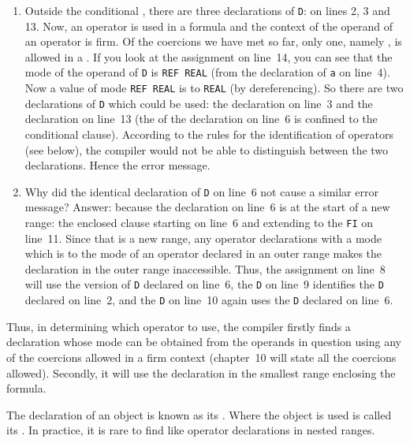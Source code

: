 \begin{enumerate}
\item Outside the conditional ,
there are three declarations of \verb|D|: on lines 2, 3 and 13. Now,
an operator is used in a formula and the context of the operand of an
operator is firm. Of the coercions we have met so far, only one,
namely , is allowed in
a .  If you look at the assignment
on line~14, you can see that the mode of the operand of \verb|D| is
\verb|REF REAL| (from the declaration of \verb|a| on line~4).  Now a
value of mode \verb|REF REAL| is  to \verb|REAL|
(by dereferencing).  So there are two declarations of \verb|D| which
could be used: the declaration on line~3 and the declaration on
line~13 (the  of the declaration on line~6 is confined to
the conditional clause).  According to the rules for the
identification of operators (see below), the compiler would not be
able to distinguish between the two declarations.  Hence the error
message.
\item Why did the identical declaration of \verb|D| on line~6 not
cause a similar error message? Answer: because the declaration on
line~6 is at the start of a new range: the enclosed clause starting
on line~6 and extending to the \verb|FI| on line~11.  Since that is a
new range, any operator declarations with a mode which is
 to the mode of an operator declared in an outer
range makes the declaration in the outer range inaccessible. Thus,
the assignment on line~8 will use the version of \verb|D| declared on
line~6, the \verb|D| on line~9 identifies the \verb|D| declared on
line~2, and the \verb|D| on line~10 again uses the \verb|D| declared
on line~6.
\end{enumerate}

Thus, in determining which operator to use, the compiler firstly
finds a declaration whose mode can be obtained from the operands in
question using any of the coercions allowed in a firm context
(chapter~10 will state all the coercions allowed). Secondly, it will
use the declaration in the smallest range enclosing the formula.

The declaration of an object is known as its
. Where the
object is used is called its
.  In
practice, it is rare to find like operator declarations in nested
ranges.
\newpage

